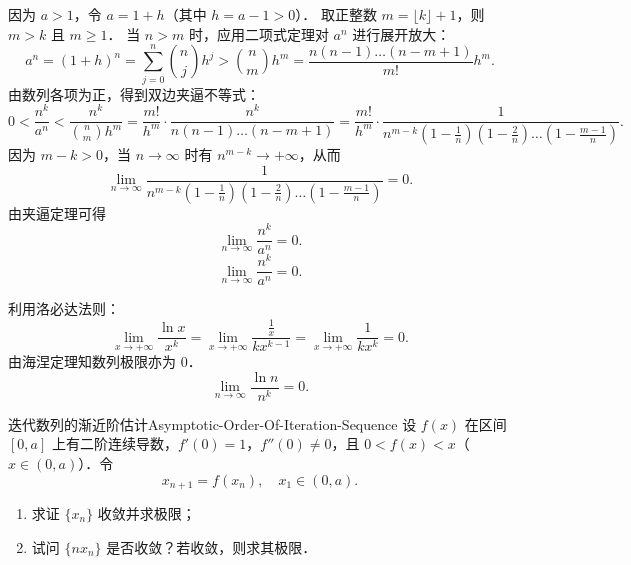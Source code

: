 \begin{solution}
    因为 $a > 1$，令 $a = 1 + h$（其中 $h = a - 1 > 0$）．
    取正整数 $m = \lfloor k \rfloor + 1$，则 $m > k$ 且 $m \geqslant 1$．
    当 $n > m$ 时，应用二项式定理对 $a^n$ 进行展开放大：
    \begin{equation}
        a^n = (1 + h)^n = \sum_{j=0}^n \binom{n}{j} h^j > \binom{n}{m} h^m = \frac{n(n-1)\dots(n-m+1)}{m!} h^m.
    \end{equation}
    由数列各项为正，得到双边夹逼不等式：
    \begin{equation}
        0 < \frac{n^k}{a^n} < \frac{n^k}{\binom{n}{m} h^m} = \frac{m!}{h^m} \cdot \frac{n^k}{n(n-1)\dots(n-m+1)} = \frac{m!}{h^m} \cdot \frac{1}{n^{m-k} \left(1 - \frac{1}{n}\right)\left(1 - \frac{2}{n}\right)\dots\left(1 - \frac{m-1}{n}\right)}.
    \end{equation}
    因为 $m - k > 0$，当 $n \to \infty$ 时有 $n^{m-k} \to +\infty$，从而
    \begin{equation}
        \lim_{n\to\infty} \frac{1}{n^{m-k} \left(1 - \frac{1}{n}\right)\left(1 - \frac{2}{n}\right)\dots\left(1 - \frac{m-1}{n}\right)} = 0.
    \end{equation}
    由夹逼定理可得
    \begin{equation}
        \lim_{n\to\infty} \frac{n^k}{a^n} = 0.
    \end{equation}
    \begin{equation}
        \boxed{\lim_{n\to\infty} \frac{n^k}{a^n} = 0.}
    \end{equation}


    利用洛必达法则：
    \begin{equation}
        \lim_{x\to +\infty} \frac{\ln x}{x^k} = \lim_{x\to +\infty} \frac{\frac{1}{x}}{k x^{k-1}} = \lim_{x\to +\infty} \frac{1}{k x^k} = 0.
    \end{equation}
    由海涅定理知数列极限亦为 $0$．
    \begin{equation}
        \boxed{\lim_{n\to\infty} \frac{\ln n}{n^k} = 0.}
    \end{equation}
\end{solution}

\begin{problem}{迭代数列的渐近阶估计}{Asymptotic-Order-Of-Iteration-Sequence}
    设 $f(x)$ 在区间 $[0, a]$ 上有二阶连续导数，$f'(0) = 1$，$f''(0) \neq 0$，且 $0 < f(x) < x$（$x \in (0, a)$）．令
    \begin{equation}
        x_{n+1} = f(x_n), \quad x_1 \in (0, a).
    \end{equation}
    \begin{enumerate}
        \item 求证 $\{x_n\}$ 收敛并求极限；
        \item 试问 $\{n x_n\}$ 是否收敛？若收敛，则求其极限．
    \end{enumerate}
\end{problem}

